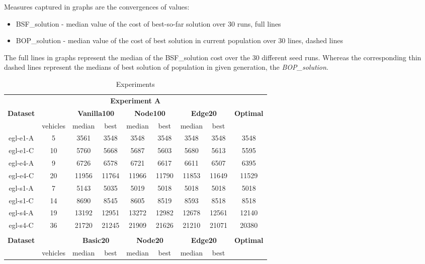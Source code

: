 \documentclass[twoside]{ctuthesis}
\theoremstyle{plain}
\theoremstyle{definition}
\theoremstyle{note}
\begin{document}
Measures captured in graphs are the convergences of values:
\begin{itemize}
	\item BSF\_solution - median value of the cost of best-so-far solution over 30 runs, full lines
	\item BOP\_solution - median value of the cost of best solution in current population over 30 lines, dashed lines
\end{itemize}


The full lines in graphs represent the median of the BSF\_solution cost over the 30 different seed runs. Whereas the corresponding thin dashed lines represent the medians of best solution of population in given generation, the \emph{BOP\_solution}.


\begin{table}[htbp]
	\centering
	\caption{Experiments}
	\label{tab:tablebig}
	\begin{tabular}{|c|c|cc|cc|cc|c|}
		\hline
		\multicolumn{9}{|c|}{\textbf{Experiment A}}\\ 
		\multicolumn{1}{|c}{\textbf{Dataset}}&\multicolumn{1}{c}{}&\multicolumn{2}{c}{\textbf{Vanilla100}}&\multicolumn{2}{c}{\textbf{Node100}}&\multicolumn{2}{c}{\textbf{Edge20}}&\textbf{Optimal} \\ \hline
		&vehicles&median&best&median&best&median&best& \\ \hline
		egl-e1-A &5& 3561&3548&3548&3548&3548&3548&3548 \\ \hline
		egl-e1-C &10& 5760&5668&5687&5603&5680&5613&5595\\ \hline
		egl-e4-A &9& 6726&6578&6721&6617&6611&6507&6395\\ \hline
		egl-e4-C &20& 11956&11764&11966&11790&11853&11649&11529 \\ \hline
		egl-s1-A &7& 5143&5035&5019&5018&5018&5018&5018 \\ \hline
		egl-s1-C &14& 8690&8545&8605&8519&8593&8518&8518\\ \hline
		egl-s4-A &19& 13192&12951&13272&12982&12678&12561&12140 \\ \hline
		egl-s4-C &36& 21720&21245&21909&21626&21210&21071&20380\\ \hhline{|=========|}
		\multicolumn{9}{|c|}{\textbf{Experiment B}}\\ 
		\multicolumn{1}{|c}{\textbf{Dataset}}&\multicolumn{1}{c}{}&\multicolumn{2}{c}{\textbf{Basic20}}&\multicolumn{2}{c}{\textbf{Node20}}&\multicolumn{2}{c}{\textbf{Edge20}}&\textbf{Optimal} \\ \hline
		&vehicles&median&best&median&best&median&best&\\ \hline

\end{tabular}
\end{table}
\end{document}
